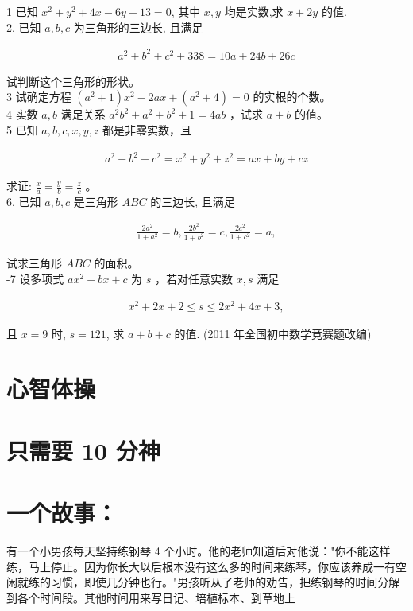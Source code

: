 \documentclass[10pt]{article}
\begin{document}
1 已知 $x^{2}+y^{2}+4 x-6 y+13=0$, 其中 $x, y$ 均是实数,求 $x+2 y$ 的值.\\
2. 已知 $a, b, c$ 为三角形的三边长, 且满足

\begin{align*}
a^{2}+b^{2}+c^{2}+338=10 a+24 b+26 c
\end{align*}

试判断这个三角形的形状。\\
3 试确定方程 $\left(a^{2}+1\right) x^{2}-2 a x+\left(a^{2}+4\right)=0$ 的实根的个数。\\
4 实数 $a, b$ 满足关系 $a^{2} b^{2}+a^{2}+b^{2}+1=4 a b$ ，试求 $a+b$ 的值。\\
5 已知 $a, b, c, x, y, z$ 都是非零实数，且

\begin{align*}
a^{2}+b^{2}+c^{2}=x^{2}+y^{2}+z^{2}=a x+b y+c z
\end{align*}

求证: $\frac{x}{a}=\frac{y}{b}=\frac{z}{c}$ 。\\
6. 已知 $a, b, c$ 是三角形 $A B C$ 的三边长, 且满足

\begin{align*}
\frac{2 a^{2}}{1+a^{2}}=b, \frac{2 b^{2}}{1+b^{2}}=c, \frac{2 c^{2}}{1+c^{2}}=a,
\end{align*}

试求三角形 $A B C$ 的面积。\\
-7 设多项式 $a x^{2}+b x+c$ 为 $s$ ，若对任意实数 $x, s$ 满足

\begin{align*}
x^{2}+2 x+2 \leqslant s \leqslant 2 x^{2}+4 x+3,
\end{align*}

且 $x=9$ 时, $s=121$, 求 $a+b+c$ 的值. (2011 年全国初中数学竞赛题改编)

\section*{心智体操}
\section*{只需要 10 分神}
\section*{一个故事：}
有一个小男孩每天坚持练钢琴 4 个小时。他的老师知道后对他说："你不能这样练，马上停止。因为你长大以后根本没有这么多的时间来练琴，你应该养成一有空闲就练的习惯，即使几分钟也行。"男孩听从了老师的劝告，把练钢琴的时间分解到各个时间段。其他时间用来写日记、培植标本、到草地上
\end{document}
